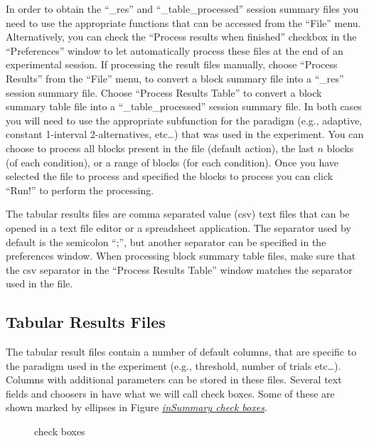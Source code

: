 \documentclass[a4paper,12pt,english]{sphinxmanual}
\begin{document}
In order to obtain the “\_res” and “\_table\_processed” session summary
files you need to use the appropriate functions that can be accessed
from the “File” menu. Alternatively, you can check the “Process results
when finished” checkbox in the “Preferences” window to let
 automatically process these files at the end of an
experimental session. If processing the result files manually, choose
“Process Results” from the “File” menu, to convert a block summary file
into a “\_res” session summary file. Choose “Process Results Table” to
convert a block summary table file into a “\_table\_processed” session
summary file. In both cases you will need to use the appropriate
subfunction for the paradigm (e.g., adaptive, constant 1-interval
2-alternatives, etc…) that was used in the experiment. You can choose to
process all blocks present in the file (default action), the last
$n$ blocks (of each condition), or a range of blocks (for each
condition). Once you have selected the file to process and specified the
blocks to process you can click “Run!” to perform the processing.

The tabular results files are comma separated value (csv) text files
that can be opened in a text file editor or a spreadsheet application.
The separator used by default is the semicolon “;”, but another
separator can be specified in the  preferences window.
When processing block summary table files, make sure that the csv
separator in the “Process Results Table” window matches the separator
used in the file.


\subsection{Tabular Results Files}
\label{engine:tabular-results-files}
The tabular result files contain a number of default columns, that are specific to the paradigm used in the experiment (e.g., threshold, number of trials etc…). Columns with additional parameters can be stored in these files. Several text fields and choosers in  have what we will call
 check boxes. Some of these are shown marked by ellipses in Figure {\hyperref[engine:fig-insummarycheckboxes]{\emph{inSummary check boxes}}}.
\begin{figure}[htbp]
\centering
\capstart

\caption{ check boxes}\label{engine:fig-insummarycheckboxes}\end{figure}
\end{document}
